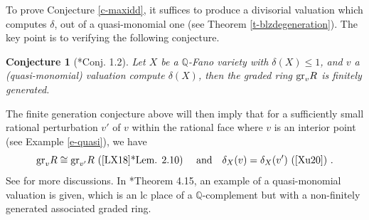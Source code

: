\documentclass[12pt,reqno]{amsart}%
\newtheorem{conj}[thm]{Conjecture}
\theoremstyle{definition}
\theoremstyle{remark}
\newcommand{\bQ}{{\mathbb{Q}}}
\begin{document}
To prove Conjecture  \ref{c-maxidd}, it suffices to produce a divisorial valuation which computes $\delta$, out of a quasi-monomial one (see Theorem \ref{t-blzdegeneration}). The key point is to verifying the following conjecture.
\begin{conj}[{\cite{Xu20}*{Conj. 1.2}}]\label{c-finitegeneration}
Let $X$ be a $\bQ$-Fano variety with $\delta(X)\le 1$, and $v$ a (quasi-monomial) valuation compute $\delta(X)$, then the graded ring ${\rm gr}_vR$ is finitely generated.
\end{conj}
The finite generation conjecture above  will then imply that for a sufficiently small rational perturbation $v'$ of $v$ within the rational face where $v$ is an interior point (see Example \ref{e-quasi}), we have
$${\rm gr}_vR\cong {\rm gr}_{v'}R\mbox{ (\cite{LX18}*{Lem. 2.10}) }\ \ \ {\rm and}\ \ \  \delta_X(v)=\delta_X(v')\mbox{  (\cite[Prop 3.9]{Xu20}) }.$$
See \cite{Xu20} for more discussions.  In \cite{AZ20}*{Theorem 4.15}, an example of a quasi-monomial valuation is given, which is an lc place of a $\mathbb Q$-complement but with a non-finitely generated associated graded ring.
\end{document}
